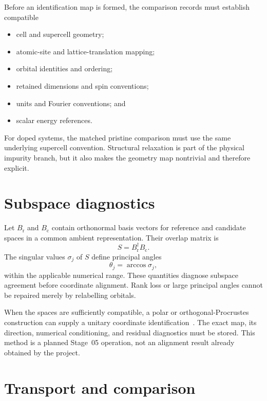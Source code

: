 Before an identification map is formed, the comparison records must establish
compatible

\begin{itemize}
  \item cell and supercell geometry;
  \item atomic-site and lattice-translation mapping;
  \item orbital identities and ordering;
  \item retained dimensions and spin conventions;
  \item units and Fourier conventions; and
  \item scalar energy references.
\end{itemize}

For doped systems, the matched pristine comparison must use the same underlying
supercell convention. Structural relaxation is part of the physical impurity
branch, but it also makes the geometry map nontrivial and therefore explicit.

\section{Subspace diagnostics}

Let $B_{\mathrm r}$ and $B_{\mathrm c}$ contain orthonormal basis vectors for
reference and candidate spaces in a common ambient representation. Their
overlap matrix is
\begin{equation}
  S=B_{\mathrm r}^{\dagger}B_{\mathrm c}.
\end{equation}
The singular values $\sigma_j$ of $S$ define principal
angles~\cite{bjork1973}
\begin{equation}
  \theta_j=\arccos\sigma_j,
\end{equation}
within the applicable numerical range. These quantities diagnose subspace
agreement before coordinate alignment. Rank loss or large principal angles
cannot be repaired merely by relabelling orbitals.

When the spaces are sufficiently compatible, a polar or orthogonal-Procrustes
construction can supply a unitary coordinate
identification~\cite{higham1986}. The exact map,
its direction, numerical conditioning, and residual diagnostics must be stored.
This method is a planned Stage~05 operation, not an alignment result already
obtained by the project.

\section{Transport and comparison}

